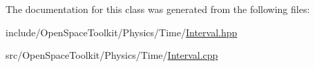 The documentation for this class was generated from the following files\+:\begin{DoxyCompactItemize}
\item 
include/\+Open\+Space\+Toolkit/\+Physics/\+Time/\hyperlink{_interval_8hpp}{Interval.\+hpp}\item 
src/\+Open\+Space\+Toolkit/\+Physics/\+Time/\hyperlink{_interval_8cpp}{Interval.\+cpp}\end{DoxyCompactItemize}
